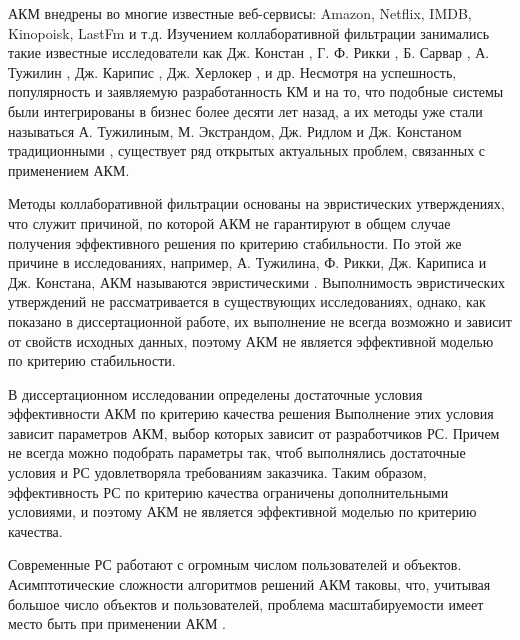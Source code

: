АКМ внедрены
во многие известные веб-сервисы: Amazon, Netflix, IMDB, Kinopoisk, LastFm и т.д.
Изучением коллаборативной фильтрации занимались такие известные исследователи как
Дж. Констан \cite{cfrs, usenet, item-based,framework-cf,e-commerce,content8,cf-expert},
Г. Ф. Рикки \cite{heur3,rs-handbook},
Б. Сарвар \cite{item-based,e-commerce},
А. Тужилин \cite{heur1,toward,2d},
Дж. Карипис \cite{item-based,e-commerce,topn1,topn2},
Дж. Херлокер \cite{usenet,framework-cf,content8,cf-expert,cluster1},
и др.
Несмотря на успешность, популярность и заявляемую разработанность
КМ и на то,
что подобные системы были интегрированы в бизнес более десяти лет назад,
а их методы уже стали называться А. Тужилиным, М. Экстрандом,
Дж. Ридлом и Дж. Констаном традиционными \cite{cfrs, 2d},
существует ряд открытых актуальных проблем, связанных с применением АКМ.

Методы коллаборативной фильтрации основаны на эвристических утверждениях,
что служит причиной, по которой АКМ не гарантируют в общем случае
получения эффективного решения по критерию стабильности.
По этой же причине в исследованиях, например,
А. Тужилина, Ф. Рикки, Дж. Кариписа и Дж. Констана, АКМ называются
эвристическими \cite{heur3,heur1, heur2}.
Выполнимость эвристических утверждений не рассматривается в существующих
исследованиях, однако, как показано в диссертационной работе, их выполнение
не всегда возможно и зависит от свойств исходных данных,
поэтому АКМ не является эффективной моделью
по критерию стабильности.

В диссертационном исследовании определены
достаточные условия эффективности АКМ по критерию качества решения
Выполнение этих условия зависит параметров АКМ, выбор которых зависит
от разработчиков РС. Причем не всегда можно подобрать параметры так, чтоб
выполнялись достаточные условия и РС удовлетворяла требованиям заказчика.
Таким образом, эффективность РС по критерию качества ограничены дополнительными
условиями, и поэтому АКМ не является эффективной моделью по критерию качества.

Современные РС работают с огромным числом пользователей и объектов.
Асимптотические сложности алгоритмов решений АКМ таковы, что, учитывая
большое число объектов и пользователей, проблема масштабируемости
имеет место быть
при применении АКМ \cite{amazon-item2item,amazon-linden}.


